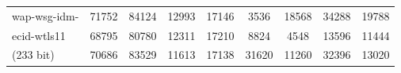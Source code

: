 \documentclass[a4paper]{article}
\begin{document}
\begin{center}
\begin{longtable}{ |l|c|c|c|c|c|c|c|c| }
wap-wsg-idm- & 71752 & 84124 & 12993 & 17146 & 3536 & 18568 & 34288 & 19788 \\
ecid-wtls11 & 68795 & 80780 & 12311 & 17210 & 8824 & 4548 & 13596 & 11444 \\ 
(233 bit) & 70686 & 83529 & 11613 & 17138 & 31620 & 11260 & 32396 & 13020 \\ \hline

    \end{longtable}
\end{center}
   	
\end{document}
